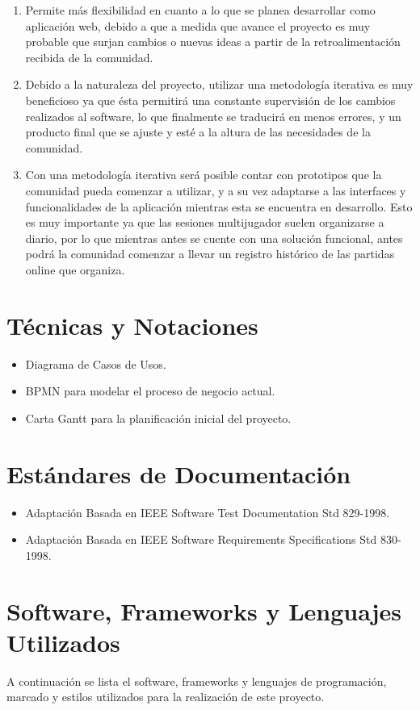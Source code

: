 \begin{enumerate}
	\item Permite más flexibilidad en cuanto a lo que se planea desarrollar como aplicación web, debido a que a medida que avance el proyecto es muy probable que surjan cambios o nuevas ideas a partir de la retroalimentación recibida de la comunidad.
	\item Debido a la naturaleza del proyecto, utilizar una metodología iterativa es muy beneficioso ya que ésta permitirá una constante supervisión de los cambios realizados al software, lo que finalmente se traducirá en menos errores, y un producto final que se ajuste y esté a la altura de las necesidades de la comunidad.
	\item Con una metodología iterativa será posible contar con prototipos que la comunidad pueda comenzar a utilizar, y a su vez adaptarse a las interfaces y funcionalidades de la aplicación mientras esta se encuentra en desarrollo. Esto es muy importante ya que las sesiones multijugador suelen organizarse a diario, por lo que mientras antes se cuente con una solución funcional, antes podrá la comunidad comenzar a llevar un registro histórico de las partidas online que organiza.
\end{enumerate}

\section{Técnicas y Notaciones}
\begin{itemize}
	\item Diagrama de Casos de Usos.
	\item BPMN para modelar el proceso de negocio actual.
	\item Carta Gantt para la planificación inicial del proyecto.
\end{itemize}

\section{Estándares de Documentación}
\begin{itemize}
	\item Adaptación Basada en IEEE Software Test Documentation Std 829-1998.
	\item Adaptación Basada en IEEE Software Requirements Specifications Std 830-1998.
\end{itemize}

\section{Software, Frameworks y  Lenguajes Utilizados}
\label{project:software}
A continuación se lista el software, frameworks y lenguajes de programación, marcado y estilos utilizados para la realización de este proyecto.

